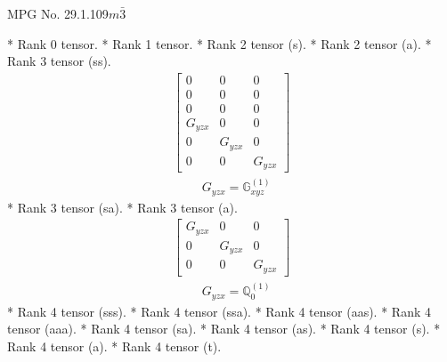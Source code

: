 \documentclass[fleqn,8pt,landscape]{jsarticle}
\begin{document}
\setcounter{MaxMatrixCols}{32}

\renewcommand{\tablename}{Table~}
\renewcommand{\figurename}{Figure~}
\begin{center}
\LARGE
MPG No. 29.1.109\quad$m\bar{3}$
\end{center}
* Rank 0 tensor.
* Rank 1 tensor.
* Rank 2 tensor (s).
* Rank 2 tensor (a).
* Rank 3 tensor (ss).
\begin{align*}
\begin{bmatrix} 0 & 0 & 0 \\ 0 & 0 & 0 \\ 0 & 0 & 0 \\ G_{yzx} & 0 & 0 \\ 0 & G_{yzx} & 0 \\ 0 & 0 & G_{yzx} \end{bmatrix}
\end{align*}
\begin{align*}
& G_{yzx} = \mathbb{G}_{xyz}^{(1)}
\end{align*}
* Rank 3 tensor (sa).
* Rank 3 tensor (a).
\begin{align*}
\begin{bmatrix} G_{yzx} & 0 & 0 \\ 0 & G_{yzx} & 0 \\ 0 & 0 & G_{yzx} \end{bmatrix}
\end{align*}
\begin{align*}
& G_{yzx} = \mathbb{Q}_{0}^{(1)}
\end{align*}
* Rank 4 tensor (sss).
* Rank 4 tensor (ssa).
* Rank 4 tensor (aas).
* Rank 4 tensor (aaa).
* Rank 4 tensor (sa).
* Rank 4 tensor (as).
* Rank 4 tensor (s).
* Rank 4 tensor (a).
* Rank 4 tensor (t).
\end{document}

